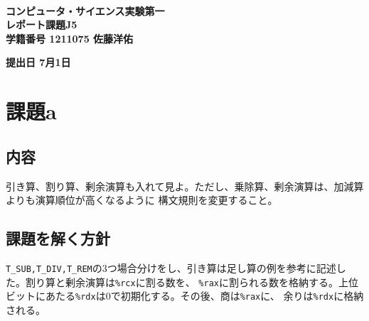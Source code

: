 \documentclass[a4paper,11pt]{jarticle}
\begin{document}
\thispagestyle{empty}
\begin{center}
\begin{Huge}
~\\
{\bf コンピュータ・サイエンス実験第一}\\
\vspace{1cm}
{\bf レポート課題J5}\\
\vspace{2cm}
{\bf 学籍番号 1211075  佐藤洋佑}\\
\end{Huge}
\end{center}
\vspace{17cm}
\begin{flushright}
{\bf 提出日 7月1日}\\
\end{flushright}
\newpage

\section{課題a}
\subsection{内容}
引き算、割り算、剰余演算も入れて見よ。ただし、乗除算、剰余演算は、加減算よりも演算順位が高くなるように
構文規則を変更すること。\\
\subsection{課題を解く方針}
\verb|T_SUB,T_DIV,T_REM|の3つ場合分けをし、引き算は足し算の例を参考に記述した。割り算と剰余演算は\verb|%rcx|に割る数を、
\verb|%rax|に割られる数を格納する。上位ビットにあたる\verb|%rdx|は0で初期化する。その後、商は\verb|%rax|に、
余りは\verb|%rdx|に格納される。\\
\end{document}
